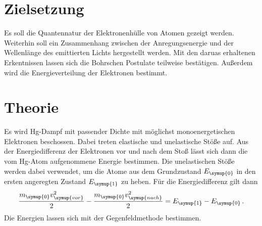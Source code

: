 \section{Zielsetzung}
\label{sec:Zielsetzung}
Es soll die Quantennatur der Elektronenhülle von Atomen gezeigt werden. Weiterhin soll ein Zusammenhang zwischen
der Anregungsenergie und der Wellenlänge des emittierten Lichts hergestellt werden. Mit den daruas erhaltenen
Erkentnissen lassen sich die Bohrschen Postulate teilweise bestätigen. Außerdem wird die Energieverteilung der
Elektronen bestimmt.

\section{Theorie}
\label{sec:Theorie}
Es wird Hg-Dampf mit passender Dichte mit möglichst monoenergetischen Elektronen beschossen. Dabei treten
elastische und unelastische Stöße auf. Aus der Energiedifferenz der Elektronen vor und nach dem Stoß lässt
sich dann die vom Hg-Atom aufgenommene Energie bestimmen. Die unelastischen Stöße werden dabei verwendet, um
die Atome aus dem Grundzustand $E_{\symup{0}}$ in den ersten angeregten Zustand $E_{\symup{1}}$ zu heben.
Für die Energiedifferenz gilt dann
\begin{equation}
    \label{eqn:Ediff}
    \frac{m_{\symup{0}}v_{\symup{vor}}^2}{2} - \frac{m_{\symup{0}}v_{\symup{nach}}^2}{2}
    = E_{\symup{1}} - E_{\symup{0}}\,.
\end{equation}
Die Energien lassen sich mit der Gegenfeldmethode bestimmen.

